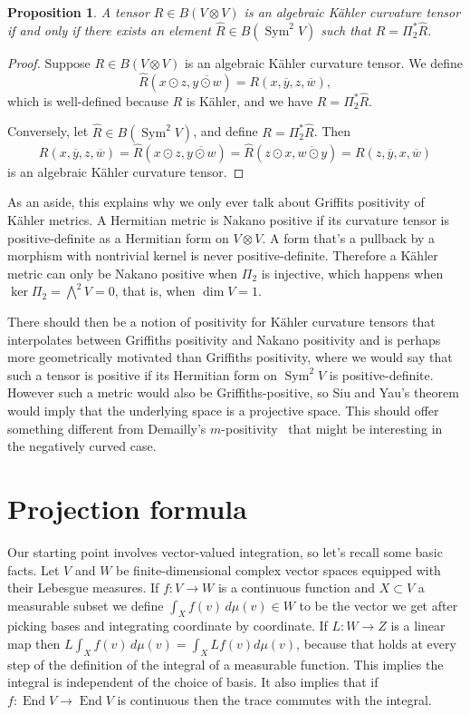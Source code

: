 \documentclass[10pt,a4paper]{amsart}
\newtheorem{prop}[theo]{Proposition}
\theoremstyle{definition}
\def\ov#1{\overline{#1}}
\def\d{\,d}
\DeclareMathOperator{\Sym}{Sym}
\DeclareMathOperator{\End}{End}
\begin{document}
\begin{prop}
A tensor $R \in B(V \otimes V)$ is an algebraic K\"ahler curvature tensor
if and only if there exists an element $\hat R \in B(\Sym^2 V)$ such that $R =
\Pi_2^* \hat R$.
\end{prop}

\begin{proof}
Suppose $R \in B(V \otimes V)$ is an algebraic K\"ahler curvature tensor.
We define
$$
\hat R(x \odot z, \ov{y \odot w})
= R(x, \ov y, z, \ov w),
$$
which is well-defined because $R$ is K\"ahler, and we have $R = \Pi_2^* \hat R$.

Conversely, let $\hat R \in B(\Sym^2 V)$, and define $R = \Pi_2^* \hat R$.
Then
$$
R(x, \ov y, z, \ov w)
= \hat R(x \odot z, \ov{y \odot w})
= \hat R(z \odot x, \ov{w \odot y})
= R(z, \ov y, x, \ov w)
$$
is an algebraic K\"ahler curvature tensor.
\end{proof}

As an aside, this explains why we only ever talk about Griffits
positivity of K\"ahler metrics.
A Hermitian metric is Nakano positive if its curvature tensor is
positive-definite as a Hermitian form on $V \otimes V$.
A form that's a pullback by a morphism with nontrivial
kernel is never positive-definite.
Therefore a K\"ahler metric can only be Nakano positive when $\Pi_2$ is
injective, which happens when $\ker \Pi_2 = \bigwedge^2 V = 0$,
that is, when $\dim V = 1$.

There should then be a notion of positivity for K\"ahler curvature tensors that
interpolates between Griffiths positivity and Nakano positivity and is perhaps
more geometrically motivated than Griffiths positivity, where we would say that
such a tensor is positive if its Hermitian form on $\Sym^2 V$ is
positive-definite.
However such a metric would also be Griffiths-positive, so Siu and Yau's
theorem would imply that the underlying space is a projective space.
This should offer something different from Demailly's
$m$-positivity~\cite[Chapter~7, Definition~6.5]{agbook} that might be
interesting in the negatively curved case.



\section{Projection formula}

Our starting point involves vector-valued integration, so let's recall
some basic facts.
Let $V$ and $W$ be finite-dimensional complex vector spaces equipped with their
Lebesgue measures.
If $f : V \to W$ is a continuous function and $X \subset V$ a measurable subset
we define $\int_X f(v) \d\mu(v) \in W$ to be the vector we get after picking
bases and integrating coordinate by coordinate.
If $L : W \to Z$ is a linear map then $L \int_X f(v) \d\mu(v) = \int_X Lf(v)
d\mu(v)$, because that holds at every step of the definition of the integral of
a measurable function.
This implies the integral is independent of the choice of basis.
It also implies that if $f : \End V \to \End V$ is continuous then the trace
commutes with the integral.
\end{document}
